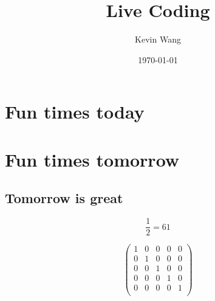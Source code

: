\documentclass{article}
\title{Live Coding}
\author{Kevin Wang}
\date{\today}
\begin{document}
\maketitle
\tableofcontents


\section{Fun times today}

\section{Fun times tomorrow}
\subsection{Tomorrow is great}


\begin{equation}
\frac{1}{2} = 61
\end{equation}




\begin{equation} %
\left(
\begin{array}{ccccc}
 1 & 0 & 0 & 0 & 0 \\
 0 & 1 & 0 & 0 & 0 \\
 0 & 0 & 1 & 0 & 0 \\
 0 & 0 & 0 & 1 & 0 \\
 0 & 0 & 0 & 0 & 1 \\
\end{array}
\right)
\end{equation}
\end{document}

